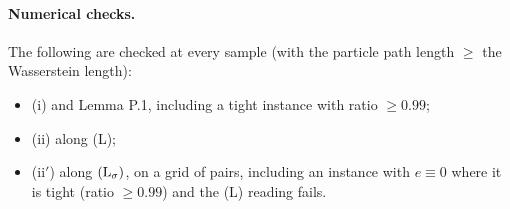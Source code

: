 \paragraph{Numerical checks.} The following are checked at every sample (with the particle path length $\ge$ the
Wasserstein length):
\begin{itemize}
  \item (i) and Lemma P.1, including a tight instance with ratio $\ge0.99$;
  \item (ii) along (L);
  \item (ii$'$) along $(\mathrm{L}_\sigma)$, on a grid of pairs, including an instance with $e\equiv0$ where it is tight (ratio
    $\ge0.99$) and the (L) reading fails.
\end{itemize}
